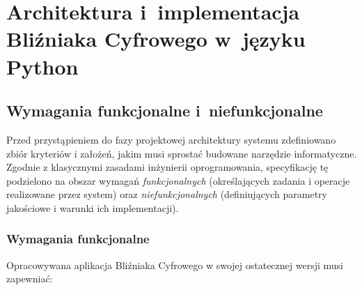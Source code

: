 \chapter{Architektura i~implementacja Bliźniaka Cyfrowego w~języku Python}
\label{ch:realizacja}


\section{Wymagania funkcjonalne i~niefunkcjonalne}
\label{sec:wymagania}

Przed przystąpieniem do fazy projektowej architektury systemu zdefiniowano zbiór kryteriów i założeń, jakim musi sprostać budowane narzędzie informatyczne. Zgodnie z klasycznymi zasadami inżynierii oprogramowania, specyfikację tę podzielono na obszar wymagań \emph{funkcjonalnych} (określających zadania i operacje realizowane przez system) oraz \emph{niefunkcjonalnych} (definiujących parametry jakościowe i warunki ich implementacji).

\subsection{Wymagania funkcjonalne}
\label{subsec:wym-funkcjonalne}

Opracowywana aplikacja Bliźniaka Cyfrowego w swojej ostatecznej wersji musi zapewniać:

